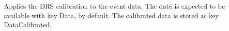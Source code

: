 Applies the DRS calibration to the event data. The data is expected to
be available with key {\ttfamily Data}, by default. The calibrated
data is stored as key {\ttfamily DataCalibrated}.